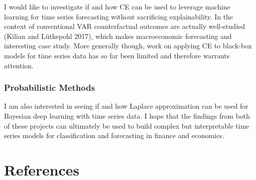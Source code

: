 \documentclass[
]{acmconf}
\begin{document}
I would like to investigate if and how CE can be used to leverage
machine learning for time series forecasting without sacrificing
explainability. In the context of conventional VAR counterfactual
outcomes are actually well-studied (Kilian and Lütkepohl 2017), which
makes macroeconomic forecasting and interesting case study. More
generally though, work on applying CE to black-box models for time
series data has so far been limited and therefore warrants attention.

\hypertarget{probabilistic-methods}{%
\subsubsection{Probabilistic Methods}\label{probabilistic-methods}}

I am also interested in seeing if and how Laplace approximation can be
used for Bayesian deep learning with time series data. I hope that the
findings from both of these projects can ultimately be used to build
complex but interpretable time series models for classification and
forecasting in finance and economics.

\hypertarget{references}{%
\section*{References}\label{references}}
\end{document}
